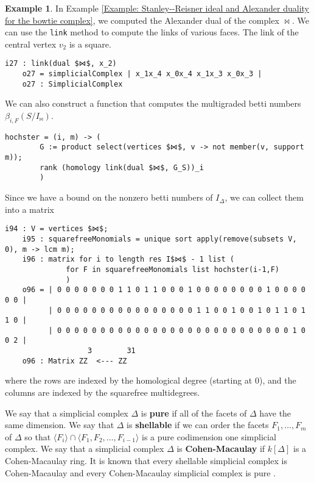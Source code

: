 \documentclass[12pt,leqno]{amsart}
\theoremstyle{definition}
\newtheorem{example}[lemma]{Example}
\begin{document}
\begin{example}
  In Example \ref{Example: Stanley--Reisner ideal and Alexander duality for
    the bowtie complex}, we computed the Alexander dual of the complex
  $\bowtie$. We can use the \texttt{link} method to compute the links of
  various faces. The link of the central vertex $v_2$ is a square.
\begin{lstlisting}[basicstyle={\ttfamily \scriptsize}, xleftmargin=-23pt]
    i27 : link(dual $⋈$, x_2)
    o27 = simplicialComplex | x_1x_4 x_0x_4 x_1x_3 x_0x_3 |
    o27 : SimplicialComplex
\end{lstlisting}
  We can also construct a function that computes the multigraded betti numbers $\beta_{i,F}(S/I_{\bowtie})$.
\begin{lstlisting}[basicstyle={\ttfamily \scriptsize}, xleftmargin=-23pt]
    hochster = (i, m) -> (
        G := product select(vertices $⋈$, v -> not member(v, support m));
        rank (homology link(dual $⋈$, G_S))_i
        )
\end{lstlisting}
  Since we have a bound on the nonzero betti numbers of $I_\Delta$, we can collect them into a matrix
\begin{lstlisting}[basicstyle={\ttfamily \scriptsize}, xleftmargin=-23pt]
    i94 : V = vertices $⋈$;
    i95 : squarefreeMonomials = unique sort apply(remove(subsets V, 0), m -> lcm m);
    i96 : matrix for i to length res I$⋈$ - 1 list (
              for F in squarefreeMonomials list hochster(i-1,F)
              )
    o96 = | 0 0 0 0 0 0 0 1 1 0 1 1 0 0 0 1 0 0 0 0 0 0 0 0 1 0 0 0 0 0 0 |
          | 0 0 0 0 0 0 0 0 0 0 0 0 0 0 0 0 1 1 0 0 1 0 0 1 0 1 1 0 1 1 0 |
          | 0 0 0 0 0 0 0 0 0 0 0 0 0 0 0 0 0 0 0 0 0 0 0 0 0 0 0 1 0 0 2 |
                   3        31
    o96 : Matrix ZZ  <--- ZZ
\end{lstlisting}
  where the rows are indexed by the homological degree (starting at $0$), and the columns are indexed by the squarefree multidegrees.
\end{example}
% 
We say that a simplicial complex $\Delta$ is \textbf{pure} if all of the facets of $\Delta$ have the same dimension. We say that $\Delta$ is \textbf{shellable} if we can order the facets $F_1,\dotsc,F_m$ of $\Delta$ so that $\langle F_i \rangle \cap \langle F_1,F_2,\dotsc,F_{i-1} \rangle$ is a pure codimension one simplicial complex. We say that a simplicial complex $\Delta$ is \textbf{Cohen-Macaulay} if $k[\Delta]$ is a Cohen-Macaulay ring. It is known that every shellable simplicial complex is Cohen-Macaulay \cite[Theorem 5.1.13]{BH} and every Cohen-Macaulay simplicial complex is pure \cite[Corollary 5.1.5]{BH}.
\end{document}
